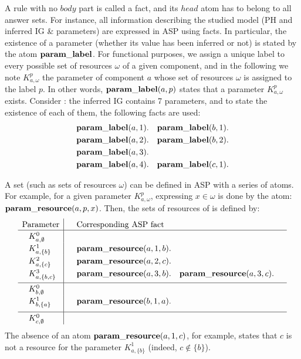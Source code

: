 A rule with no $body$ part is called a fact, and its $head$ atom has to belong to all answer sets.
For instance, all information describing the studied model (PH and inferred IG \& parameters) are expressed in ASP using facts.
In particular, the existence of a parameter (whether its value has been inferred or not) is stated by the atom $\mathbf{param\_label}$.
For functional purposes, we assign a unique label to every possible set of resources $\omega$ of a given component,
and in the following we note $K^p_{a,\omega}$ the parameter of component $a$ whose set of resources $\omega$ is assigned to the label $p$.
In other words, $\mathbf{param\_label}(a, p)$ states that a parameter $K^p_{a,\omega}$ exists.
Consider : the inferred IG contains 7 parameters, and to state the existence of each of them, the following facts are used:
\begin{align*}
  &\mathbf{param\_label}(a,1).
  &\mathbf{param\_label}(b,1).\\
  &\mathbf{param\_label}(a,2).
  &\mathbf{param\_label}(b,2).\\
  &\mathbf{param\_label}(a,3).\\
  &\mathbf{param\_label}(a,4).
  &\mathbf{param\_label}(c,1).
\end{align*}

A set (such as sets of resources $\omega$) can be defined in ASP with a series of atoms. 
For example, for a given parameter $K^p_{a,\omega}$, expressing $x \in \omega$ is done by the atom: $\mathbf{param\_resource}(a, p, x)$.
Then, the sets of resources of  is defined by:
$$\begin{array}{>{\hspace{.8em}}l|>{\phantom{\raisebox{.6em}{xx}}}l}
  \hspace{-.8em}\text{Parameter} & \text{Corresponding ASP fact} \\
\hline
  K^0_{a,\emptyset} & \\
  K^1_{a,\{b\}} & \paramres(a,1,b). \\
  K^2_{a,\{c\}} & \paramres(a,2,c). \\
  K^3_{a,\{b,c\}} & \paramres(a,3,b). \quad \paramres(a,3,c). \phantom{\raisebox{-.8em}{xx}} \\ \hline
  K^0_{b,\emptyset} & \\
  K^1_{b,\{a\}} & \paramres(b,1,a). \phantom{\raisebox{-1em}{xx}} \\ \hline
  K^0_{c,\emptyset} &
\end{array}$$
The absence of an atom $\mathbf{param\_resource}(a,1,c)$, for example, states that $c$ is not a resource for the parameter $K^1_{a,\{b\}}$ (indeed, $c \notin \{b\}$).



